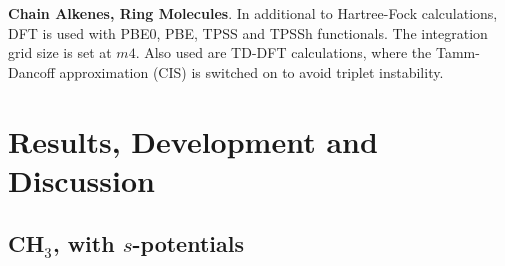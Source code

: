 \documentclass[journal=jctcce,manuscript=article]{achemso}
\begin{document}
\textbf{Chain Alkenes, Ring Molecules}. In additional to Hartree-Fock calculations, DFT is used with PBE0, PBE, TPSS and TPSSh functionals. \cite{pbe0,pbe,tpss,tpssh} The integration grid size is set at \(m4\). Also used are TD-DFT calculations, where the Tamm-Dancoff approximation (CIS) \cite{tammdancoff} is switched on to avoid triplet instability.

\section{Results, Development and Discussion}
\subsection{CH\(_{3}\), with \(s\)-potentials}

\end{document}
